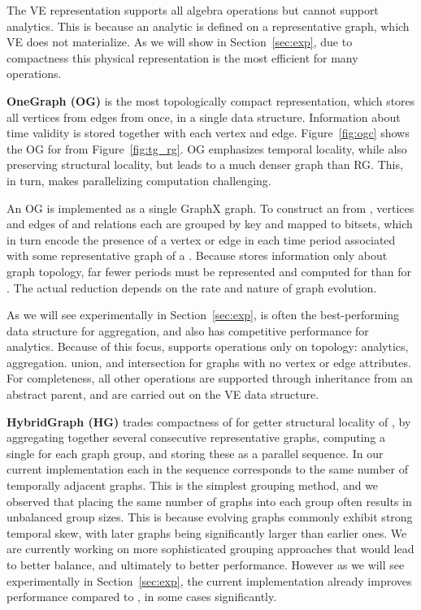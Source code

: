 
The VE representation supports all \tg algebra operations but cannot
support analytics.  This is because an analytic is defined on a
representative graph, which VE does not materialize.  As we will show
in Section~\ref{sec:exp}, due to compactness this physical
representation is the most efficient for many operations.

{\bf OneGraph (OG)} is the most topologically compact representation,
which stores all vertices from  edges from \tae\xspace
once, in a single data structure.  Information about time validity is
stored together with each vertex and edge.  Figure~\ref{fig:ogc} shows
the OG for  from Figure~\ref{fig:tg_rg}.  OG emphasizes
temporal locality, while also preserving structural locality, but
leads to a much denser graph than RG.  This, in turn, makes
parallelizing computation challenging.

An OG is implemented as a single GraphX graph.  To construct an \og
from \tve, vertices and edges of \tv and \te relations each are
grouped by key and mapped to bitsets, which in turn encode the
presence of a vertex or edge in each time period associated with some
representative graph of a \tg.  Because \og stores information only
about graph topology, far fewer periods must be represented and
computed for \og than for \rg.  The actual reduction depends on the
rate and nature of graph evolution.

As we will see experimentally in Section~\ref{sec:exp}, \og is often
the best-performing data structure for aggregation, and also has
competitive performance for analytics.  Because of this focus, \og
supports operations only on topology: analytics, aggregation. union,
and intersection for graphs with no vertex or edge attributes.  For
completeness, all other operations are supported through inheritance
from an abstract parent, and are carried out on the VE data structure.

{\bf HybridGraph (HG)} trades compactness of \og for getter structural
locality of \rg, by aggregating together several consecutive
representative graphs, computing a single \og for each graph group,
and storing these as a parallel sequence.  In our current
implementation each \og in the sequence corresponds to the same number
of temporally adjacent graphs.
%
This is the simplest grouping method, and we observed that placing the
same number of graphs into each group often results in unbalanced
group sizes.  This is because evolving graphs commonly exhibit strong
temporal skew, with later graphs being significantly larger than earlier
ones.  We are currently working on more sophisticated grouping
approaches that would lead to better balance, and ultimately to better
performance.  However as we will see experimentally in
Section~\ref{sec:exp}, the current \hg implementation already improves
performance compared to \og, in some cases significantly.

